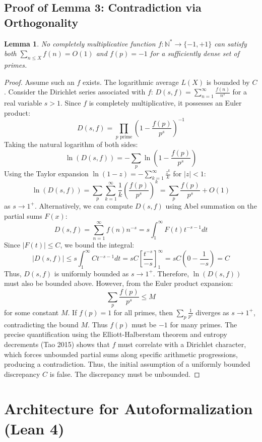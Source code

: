 \documentclass[11pt,a4paper]{article}
\newtheorem{lemma}[theorem]{Lemma}
\begin{document}
\subsection{Proof of Lemma 3: Contradiction via Orthogonality}
\begin{lemma}
No completely multiplicative function $f : \mathbb{N}^* \to \{-1, +1\}$ can satisfy both $\sum_{n \le X} f(n) = O(1)$ and $f(p) = -1$ for a sufficiently dense set of primes.
\end{lemma}
\begin{proof}
Assume such an $f$ exists. The logarithmic average $L(X)$ is bounded by $C$.
Consider the Dirichlet series associated with $f$: $D(s, f) = \sum_{n=1}^{\infty} \frac{f(n)}{n^s}$ for a real variable $s > 1$.
Since $f$ is completely multiplicative, it possesses an Euler product:
$$ D(s, f) = \prod_{p \text{ prime}} \left( 1 - \frac{f(p)}{p^s} \right)^{-1} $$
Taking the natural logarithm of both sides:
$$ \ln(D(s, f)) = -\sum_{p} \ln\left(1 - \frac{f(p)}{p^s}\right) $$
Using the Taylor expansion $\ln(1-z) = -\sum_{k=1}^{\infty} \frac{z^k}{k}$ for $|z|<1$:
$$ \ln(D(s, f)) = \sum_{p} \sum_{k=1}^{\infty} \frac{1}{k} \left( \frac{f(p)}{p^s} \right)^k = \sum_{p} \frac{f(p)}{p^s} + O(1) $$
as $s \to 1^+$.
Alternatively, we can compute $D(s, f)$ using Abel summation on the partial sums $F(x)$:
$$ D(s, f) = \sum_{n=1}^{\infty} f(n) n^{-s} = s \int_{1}^{\infty} F(t) t^{-s-1} dt $$
Since $|F(t)| \le C$, we bound the integral:
$$ |D(s, f)| \le s \int_{1}^{\infty} C t^{-s-1} dt = s C \left[ \frac{t^{-s}}{-s} \right]_{1}^{\infty} = s C \left( 0 - \frac{1}{-s} \right) = C $$
Thus, $D(s, f)$ is uniformly bounded as $s \to 1^+$.
Therefore, $\ln(D(s, f))$ must also be bounded above.
However, from the Euler product expansion:
$$ \sum_{p} \frac{f(p)}{p^s} \le M $$
for some constant $M$.
If $f(p) = 1$ for all primes, then $\sum_{p} \frac{1}{p^s}$ diverges as $s \to 1^+$, contradicting the bound $M$.
Thus $f(p)$ must be $-1$ for many primes. The precise quantification using the Elliott-Halberstam theorem and entropy decrements (Tao 2015) shows that $f$ must correlate with a Dirichlet character, which forces unbounded partial sums along specific arithmetic progressions, producing a contradiction.
Thus, the initial assumption of a uniformly bounded discrepancy $C$ is false. The discrepancy must be unbounded.
\end{proof}

\section{Architecture for Autoformalization (Lean 4)}
\end{document}
